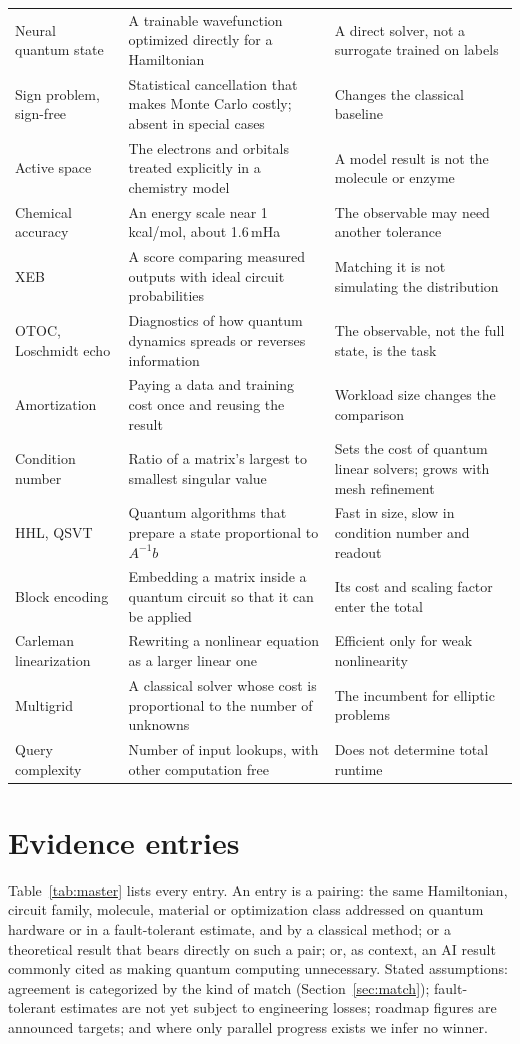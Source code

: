 {\begin{longtable}{@{}L{3.4cm} L{7.1cm} L{5.2cm}@{}}
Neural quantum state & A trainable wavefunction optimized directly for a Hamiltonian & A direct solver, not a surrogate trained on labels\\
Sign problem, sign-free & Statistical cancellation that makes Monte Carlo costly; absent in special cases & Changes the classical baseline\\
Active space & The electrons and orbitals treated explicitly in a chemistry model & A model result is not the molecule or enzyme\\
Chemical accuracy & An energy scale near 1\,kcal/mol, about 1.6\,mHa & The observable may need another tolerance\\
XEB & A score comparing measured outputs with ideal circuit probabilities & Matching it is not simulating the distribution\\
OTOC, Loschmidt echo & Diagnostics of how quantum dynamics spreads or reverses information & The observable, not the full state, is the task\\
Amortization & Paying a data and training cost once and reusing the result & Workload size changes the comparison\\
Condition number & Ratio of a matrix's largest to smallest singular value & Sets the cost of quantum linear solvers; grows with mesh refinement\\
HHL, QSVT & Quantum algorithms that prepare a state proportional to $A^{-1}b$ & Fast in size, slow in condition number and readout\\
Block encoding & Embedding a matrix inside a quantum circuit so that it can be applied & Its cost and scaling factor enter the total\\
Carleman linearization & Rewriting a nonlinear equation as a larger linear one & Efficient only for weak nonlinearity\\
Multigrid & A classical solver whose cost is proportional to the number of unknowns & The incumbent for elliptic problems\\
Query complexity & Number of input lookups, with other computation free & Does not determine total runtime\\
\end{longtable}
}

\section{Evidence entries}
\label{app:entries}
Table~\ref{tab:master} lists every entry. An entry is a pairing: the same Hamiltonian, circuit family, molecule, material or optimization class addressed on quantum hardware or in a fault-tolerant estimate, and by a classical method; or a theoretical result that bears directly on such a pair; or, as context, an AI result commonly cited as making quantum computing unnecessary. Stated assumptions: agreement is categorized by the kind of match (Section~\ref{sec:match}); fault-tolerant estimates are not yet subject to engineering losses; roadmap figures are announced targets; and where only parallel progress exists we infer no winner.

